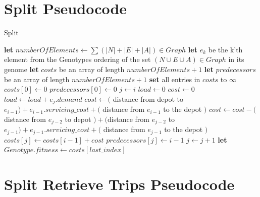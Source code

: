 \section{Split Pseudocode} %
\label{sec:split_pseudocode}


\begin{algorithm}[H]
\caption{Split}\label{split-pseudocode}
\begin{algorithmic}[1]

	\State \textbf{let} $numberOfElements \leftarrow \sum (|N|+|E|+|A|) \in Graph$
	\State \textbf{let} $e_k$ be the k'th element from the Genotypes ordering of the set $(N \cup E \cup A) \in Graph$ in its genome
	\State \textbf{let} $costs$ be an array of length $numberOfElements + 1$
	\State \textbf{let} $predecessors$ be an array of length $numberOfElements + 1$
	\State \textbf{set} all entries in $costs$ to $\infty$
	\State $costs[0] \leftarrow 0$
	\State $predecessors[0] \leftarrow 0$
	\Statex
		\State $j \leftarrow i$
		\State $load \leftarrow 0$
		\State $cost \leftarrow 0$
		\DoWhile
			\State $load \leftarrow load + e_j.demand$
			\Statex
				\State $cost \leftarrow($ distance from depot to $e_{i-1}) + e_{i-1}.servicing\_cost +($ distance from $e_{i-1}$ to the depot $)$
			\Else
				\State $cost \leftarrow  cost - ($ distance from $e_{j-2}$ to depot $) + ($distance from $e_{j-2}$ to $e_{j-1}) + e_{j-1}.servicing\_cost +($ distance from $e_{j-1}$ to the depot $)$
			\EndIf
			\Statex
				\State $costs[j] \leftarrow costs[i - 1] + cost$
				\State $predecessors[j] \leftarrow i - 1$
			\EndIf
			\Statex
			\State $j \leftarrow j + 1$
	\EndFor
	\Statex
	\State \textbf{let} $Genotype.fitness \leftarrow costs[last\_index]$
\EndProcedure

\end{algorithmic}
\end{algorithm}


\section{Split Retrieve Trips Pseudocode} %
\label{sec:split_retrieve_trips_pseudocode}


